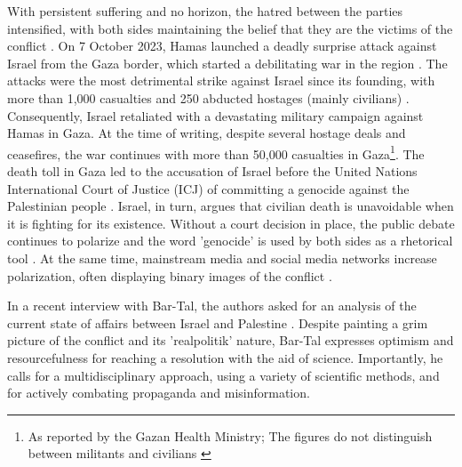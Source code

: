 \documentclass[dissertation,math,vertlayout,pdfa,colorlinks]{aaltoseries}
\begin{document}
With persistent suffering and no horizon, the hatred between the parties intensified, with both sides maintaining the belief that they are the victims of the conflict \cite{leshemSocietalBeliefsCollective2022}. On 7 October 2023, Hamas launched a deadly surprise attack against Israel from the Gaza border, which started a debilitating war in the region \cite{bymanWarTheyBoth2024}. The attacks were the most detrimental strike against Israel since its founding, with more than 1,000 casualties and 250 abducted hostages (mainly civilians) \cite{flamerAsymmetricBattleWits2025}. Consequently, Israel retaliated with a devastating military campaign against Hamas in Gaza. At the time of writing, despite several hostage deals and ceasefires, the war continues with more than 50,000 casualties in Gaza\footnote{As reported by the Gazan Health Ministry; The figures do not distinguish between militants and civilians  \cite{kershnerIsraelExpandsGaza2025}}. The death toll in Gaza led to the accusation of Israel before the United Nations International Court of Justice (ICJ) of committing a genocide against the Palestinian people \cite{atadjanovGenocideCaseIsrael2024}. Israel, in turn, argues that civilian death is unavoidable when it is fighting for its existence. Without a court decision in place, the public debate continues to polarize and the word 'genocide' is used by both sides as a rhetorical tool \cite{jamesItGenocideGaza2025}. At the same time, mainstream media and social media networks increase polarization, often displaying binary images of the conflict \cite{osimenMisconstructionEnemyImages2023}.

In a recent interview with Bar-Tal, the authors asked for an analysis of the current state of affairs between Israel and Palestine \cite{bar-talDanielBartalIsraelipalestinian2024}. Despite painting a grim picture of the conflict and its 'realpolitik' nature, Bar-Tal expresses optimism and resourcefulness for reaching a resolution with the aid of science. Importantly, he calls for a multidisciplinary approach, using a variety of scientific methods, and for actively combating propaganda and misinformation.
\end{document}
